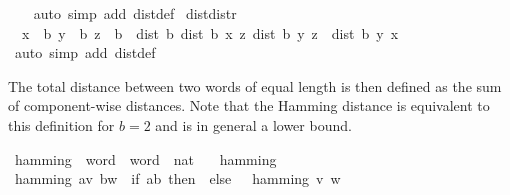 \begin{isabellebody}
%
\isadelimproof
\ \ %
\endisadelimproof
%
\isatagproof
{}\isamarkupfalse%
\ {\isacharparenleft}{\kern0pt}auto\ simp\ add{\isacharcolon}{\kern0pt}\ dist{}{\isacharunderscore}{\kern0pt}def{\isacharparenright}{\kern0pt}%
\endisatagproof
{\isafoldproof}%
%
\isadelimproof
\isanewline
%
\endisadelimproof
\isanewline
{}\isamarkupfalse%
\ dist{}{\isacharunderscore}{\kern0pt}distr{}{\isacharcolon}{\kern0pt}\isanewline
\ \ {\isachardoublequoteopen}{\isasymlbrakk}x\ {\isacharless}{\kern0pt}\ b{\isacharsemicolon}{\kern0pt}\ y\ {\isacharless}{\kern0pt}\ b{\isacharsemicolon}{\kern0pt}\ z\ {\isacharless}{\kern0pt}\ b{\isasymrbrakk}\ {\isasymLongrightarrow}\ dist{}\ b\ {\isacharparenleft}{\kern0pt}dist{}\ b\ x\ z{\isacharparenright}{\kern0pt}\ {\isacharparenleft}{\kern0pt}dist{}\ b\ y\ z{\isacharparenright}{\kern0pt}\ {\isacharequal}{\kern0pt}\ dist{}\ b\ y\ x{\isachardoublequoteclose}\isanewline
%
\isadelimproof
\ \ %
\endisadelimproof
%
\isatagproof
{}\isamarkupfalse%
\ {\isacharparenleft}{\kern0pt}auto\ simp\ add{\isacharcolon}{\kern0pt}\ dist{}{\isacharunderscore}{\kern0pt}def{\isacharparenright}{\kern0pt}%
\endisatagproof
{\isafoldproof}%
%
\isadelimproof
%
\endisadelimproof
%
\isadelimdocument
%
\endisadelimdocument
%
\isatagdocument
%
\isamarkuptrue%
%
\endisatagdocument
{\isafolddocument}%
%
\isadelimdocument
%
\endisadelimdocument
%
\begin{isamarkuptext}%
The total distance between two words of equal length is then defined as
  the sum of component-wise distances.
Note that the Hamming distance is equivalent to this definition for $b=2$
  and is in general a lower bound.%
\end{isamarkuptext}\isamarkuptrue%
\isamarkupfalse%
\ hamming\ {\isacharcolon}{\kern0pt}{\isacharcolon}{\kern0pt}\ {\isachardoublequoteopen}word\ {\isasymRightarrow}\ word\ {\isasymRightarrow}\ nat{\isachardoublequoteclose}\ \isanewline
\ \ {\isachardoublequoteopen}hamming\ {\isacharbrackleft}{\kern0pt}{\isacharbrackright}{\kern0pt}\ {\isacharbrackleft}{\kern0pt}{\isacharbrackright}{\kern0pt}\ {\isacharequal}{\kern0pt}\ {}{\isachardoublequoteclose}\isanewline
{\isacharbar}{\kern0pt}\ {\isachardoublequoteopen}hamming\ {\isacharparenleft}{\kern0pt}a{\isacharhash}{\kern0pt}v{\isacharparenright}{\kern0pt}\ {\isacharparenleft}{\kern0pt}b{\isacharhash}{\kern0pt}w{\isacharparenright}{\kern0pt}\ {\isacharequal}{\kern0pt}\ {\isacharparenleft}{\kern0pt}if\ a{\isasymnoteq}b\ then\ {}\ else\ {}{\isacharparenright}{\kern0pt}\ {\isacharplus}{\kern0pt}\ hamming\ v\ w{\isachardoublequoteclose}%

\end{isabellebody}
